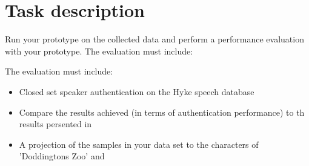 \section{Task description}

Run your prototype on the collected data and perform a performance evaluation with your prototype. The evaluation must include:

The evaluation must include:
\begin{itemize}
	\item Closed set speaker authentication on the Hyke speech database
	\item Compare the results achieved (in terms of authentication performance) to th results persented in 
	\item A projection of the samples in your data set to the characters of 'Doddingtons Zoo' and 
\end{itemize}
